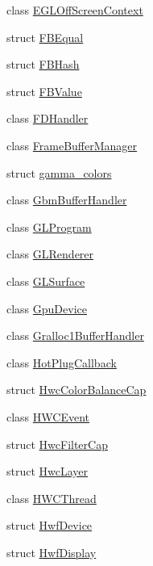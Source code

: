 \begin{DoxyCompactItemize}
\item 
class \mbox{\hyperlink{classhwcomposer_1_1EGLOffScreenContext}{E\+G\+L\+Off\+Screen\+Context}}
\item 
struct \mbox{\hyperlink{structhwcomposer_1_1FBEqual}{F\+B\+Equal}}
\item 
struct \mbox{\hyperlink{structhwcomposer_1_1FBHash}{F\+B\+Hash}}
\item 
struct \mbox{\hyperlink{structhwcomposer_1_1FBValue}{F\+B\+Value}}
\item 
class \mbox{\hyperlink{classhwcomposer_1_1FDHandler}{F\+D\+Handler}}
\item 
class \mbox{\hyperlink{classhwcomposer_1_1FrameBufferManager}{Frame\+Buffer\+Manager}}
\item 
struct \mbox{\hyperlink{structhwcomposer_1_1gamma__colors}{gamma\+\_\+colors}}
\item 
class \mbox{\hyperlink{classhwcomposer_1_1GbmBufferHandler}{Gbm\+Buffer\+Handler}}
\item 
class \mbox{\hyperlink{classhwcomposer_1_1GLProgram}{G\+L\+Program}}
\item 
class \mbox{\hyperlink{classhwcomposer_1_1GLRenderer}{G\+L\+Renderer}}
\item 
class \mbox{\hyperlink{classhwcomposer_1_1GLSurface}{G\+L\+Surface}}
\item 
class \mbox{\hyperlink{classhwcomposer_1_1GpuDevice}{Gpu\+Device}}
\item 
class \mbox{\hyperlink{classhwcomposer_1_1Gralloc1BufferHandler}{Gralloc1\+Buffer\+Handler}}
\item 
class \mbox{\hyperlink{classhwcomposer_1_1HotPlugCallback}{Hot\+Plug\+Callback}}
\item 
struct \mbox{\hyperlink{structhwcomposer_1_1HwcColorBalanceCap}{Hwc\+Color\+Balance\+Cap}}
\item 
class \mbox{\hyperlink{classhwcomposer_1_1HWCEvent}{H\+W\+C\+Event}}
\item 
struct \mbox{\hyperlink{structhwcomposer_1_1HwcFilterCap}{Hwc\+Filter\+Cap}}
\item 
struct \mbox{\hyperlink{structhwcomposer_1_1HwcLayer}{Hwc\+Layer}}
\item 
class \mbox{\hyperlink{classhwcomposer_1_1HWCThread}{H\+W\+C\+Thread}}
\item 
struct \mbox{\hyperlink{structhwcomposer_1_1HwfDevice}{Hwf\+Device}}
\item 
struct \mbox{\hyperlink{structhwcomposer_1_1HwfDisplay}{Hwf\+Display}}
\item 

\end{DoxyCompactItemize}
